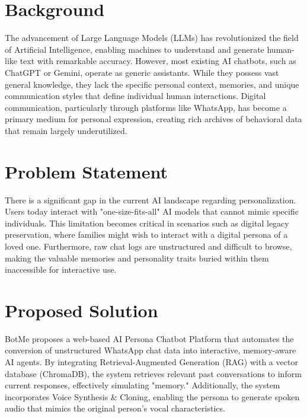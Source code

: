 \documentclass[12pt,a4paper]{report}
\begin{document}
\section{Background}
The advancement of Large Language Models (LLMs) has revolutionized the field of Artificial Intelligence, enabling machines to understand and generate human-like text with remarkable accuracy. However, most existing AI chatbots, such as ChatGPT or Gemini, operate as generic assistants. While they possess vast general knowledge, they lack the specific personal context, memories, and unique communication styles that define individual human interactions. Digital communication, particularly through platforms like WhatsApp, has become a primary medium for personal expression, creating rich archives of behavioral data that remain largely underutilized.

\section{Problem Statement}
There is a significant gap in the current AI landscape regarding personalization. Users today interact with "one-size-fits-all" AI models that cannot mimic specific individuals. This limitation becomes critical in scenarios such as digital legacy preservation, where families might wish to interact with a digital persona of a loved one. Furthermore, raw chat logs are unstructured and difficult to browse, making the valuable memories and personality traits buried within them inaccessible for interactive use.

\section{Proposed Solution}
BotMe proposes a web-based AI Persona Chatbot Platform that automates the conversion of unstructured WhatsApp chat data into interactive, memory-aware AI agents. By integrating Retrieval-Augmented Generation (RAG) with a vector database (ChromaDB), the system retrieves relevant past conversations to inform current responses, effectively simulating "memory." Additionally, the system incorporates Voice Synthesis \& Cloning, enabling the persona to generate spoken audio that mimics the original person's vocal characteristics.
\end{document}
